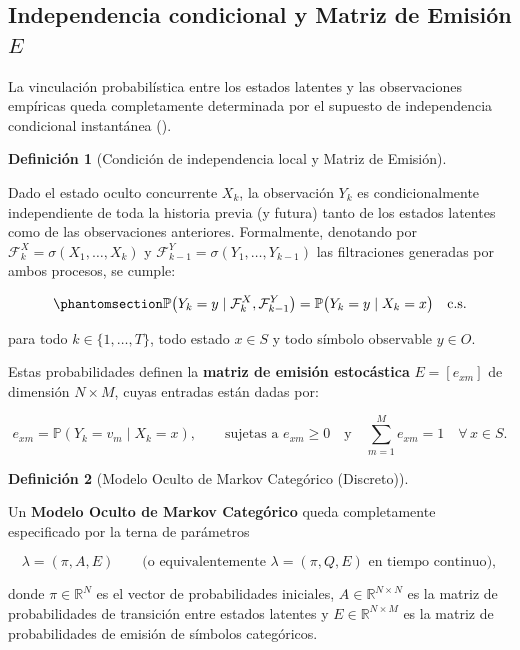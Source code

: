 \documentclass[
  spanish,
  us-letterpaper,
]{scrreprt}
\theoremstyle{definition}
\newtheorem{definition}{Definición}[chapter]
\theoremstyle{remark}
\begin{document}
\subsection{\texorpdfstring{Independencia condicional y Matriz de
Emisión
\(E\)}{Independencia condicional y Matriz de Emisión E}}\label{independencia-condicional-y-matriz-de-emisiuxf3n-e}

La vinculación probabilística entre los estados latentes y las
observaciones empíricas queda completamente determinada por el supuesto
de independencia condicional instantánea
().

\begin{definition}[Condición de independencia local y Matriz de
Emisión]\protect\hypertarget{def-independencia-emision}{}\label{def-independencia-emision}

Dado el estado oculto concurrente \(X_k\), la observación \(Y_k\) es
condicionalmente independiente de toda la historia previa (y futura)
tanto de los estados latentes como de las observaciones anteriores.
Formalmente, denotando por \(\mathcal{F}_k^X = \sigma(X_1, \dots, X_k)\)
y \(\mathcal{F}_{k-1}^Y = \sigma(Y_1, \dots, Y_{k-1})\) las filtraciones
generadas por ambos procesos, se cumple:

\begin{equation}\phantomsection\label{eq-matrizemision}{
\mathbb{P}\bigl(Y_k = y \mid \mathcal{F}_k^X, \mathcal{F}_{k-1}^Y\bigr)
=
\mathbb{P}\bigl(Y_k = y \mid X_k = x\bigr)
\quad \text{c.s.}
}\end{equation}

para todo \(k \in \{1, \dots, T\}\), todo estado \(x \in S\) y todo
símbolo observable \(y \in O\).

Estas probabilidades definen la \textbf{matriz de emisión estocástica}
\(E = [e_{xm}]\) de dimensión \(N \times M\), cuyas entradas están dadas
por:

\[
e_{xm} = \mathbb{P}(Y_k = v_m \mid X_k = x), \qquad \text{sujetas a } e_{xm} \ge 0 \quad \text{y} \quad \sum_{m=1}^{M} e_{xm} = 1 \quad \forall\, x \in S.
\]

\end{definition}

\begin{definition}[Modelo Oculto de Markov Categórico
(Discreto)]\protect\hypertarget{def-hmm-categorico}{}\label{def-hmm-categorico}

Un \textbf{Modelo Oculto de Markov Categórico} queda completamente
especificado por la terna de parámetros

\[
\lambda = (\pi, A, E) \qquad \bigl(\text{o equivalentemente } \lambda = (\pi, Q, E) \text{ en tiempo continuo}\bigr),
\]

donde \(\pi \in \mathbb{R}^N\) es el vector de probabilidades iniciales,
\(A \in \mathbb{R}^{N \times N}\) es la matriz de probabilidades de
transición entre estados latentes y \(E \in \mathbb{R}^{N \times M}\) es
la matriz de probabilidades de emisión de símbolos categóricos.

\end{definition}
\end{document}

